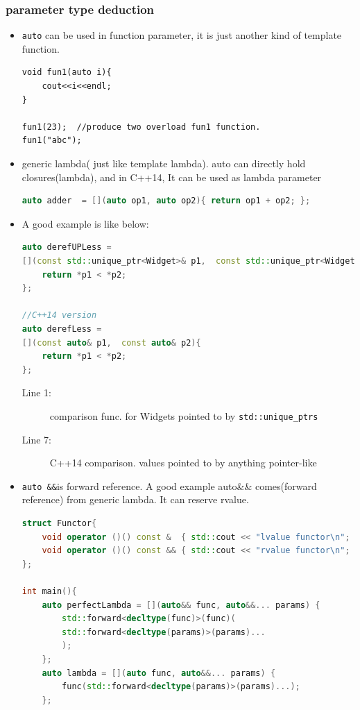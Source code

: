 \documentclass[a4paper,11pt,twoside]{book}
\begin{document}
\subsubsection{parameter type deduction}
\begin{itemize}
	\item \texttt{auto} can be used in function parameter, it is just another kind of template function.

\begin{lstlisting}[numbers=none]
void fun1(auto i){
    cout<<i<<endl;
}
		
fun1(23);  //produce two overload fun1 function.
fun1("abc");
\end{lstlisting}
    \item generic lambda( just like template lambda). auto can directly hold closures(lambda), and in C++14, It can be used as lambda parameter
\begin{lstlisting}[frame=single, language=c++]
auto adder  = [](auto op1, auto op2){ return op1 + op2; };
\end{lstlisting}
	
	\item A good example is like below:
\begin{lstlisting}[frame=single, language=c++]
auto derefUPLess =               
[](const std::unique_ptr<Widget>& p1,  const std::unique_ptr<Widget>& p2){
	return *p1 < *p2; 
};                 

//C++14 version
auto derefLess = 
[](const auto& p1,  const auto& p2){
	return *p1 < *p2; 
}; 
\end{lstlisting}
	\begin{description}
		\item[Line 1:] comparison func. for Widgets pointed to by \texttt{std::unique\_ptrs}
		\item[Line 7:] C++14 comparison. values pointed to by anything pointer-like
	\end{description}
	

	\item \texttt{auto \&\&}is forward reference. A good example auto\&\& comes(forward reference) from generic lambda. It can reserve rvalue.
\begin{lstlisting}[frame=single, language=c++]
struct Functor{
    void operator ()() const &  { std::cout << "lvalue functor\n"; }
    void operator ()() const && { std::cout << "rvalue functor\n"; }
};

int main(){
    auto perfectLambda = [](auto&& func, auto&&... params) {
        std::forward<decltype(func)>(func)(
        std::forward<decltype(params)>(params)...
        );
    };
    auto lambda = [](auto func, auto&&... params) {
        func(std::forward<decltype(params)>(params)...);
    };
    

\end{lstlisting}
\end{itemize}
\end{document}
